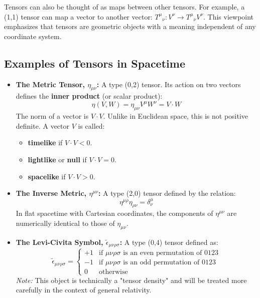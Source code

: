 \documentclass[11pt, a4paper]{report}
\begin{document}
Tensors can also be thought of as maps between other tensors. For example, a (1,1) tensor can map a vector to another vector: ${T^\mu}_\nu: V^\nu \to {T^\mu}_\nu V^\nu$. This viewpoint emphasizes that tensors are geometric objects with a meaning independent of any coordinate system.

\subsection*{Examples of Tensors in Spacetime}
\begin{itemize}
    \item \textbf{The Metric Tensor, $\eta_{\mu\nu}$:} A type (0,2) tensor. Its action on two vectors defines the \textbf{inner product} (or scalar product):
    \begin{equation}
        \eta(V, W) = \eta_{\mu\nu}V^\mu W^\nu = V \cdot W
    \end{equation}
    The norm of a vector is $V \cdot V$. Unlike in Euclidean space, this is not positive definite. A vector $V$ is called:
    \begin{itemize}
        \item \textbf{timelike} if $V \cdot V < 0$.
        \item \textbf{lightlike} or \textbf{null} if $V \cdot V = 0$.
        \item \textbf{spacelike} if $V \cdot V > 0$.
    \end{itemize}

    \item \textbf{The Inverse Metric, $\eta^{\mu\nu}$:} A type (2,0) tensor defined by the relation:
    \begin{equation}
        \eta^{\mu\rho}\eta_{\rho\nu} = \delta^\mu_\nu
    \end{equation}
    In flat spacetime with Cartesian coordinates, the components of $\eta^{\mu\nu}$ are numerically identical to those of $\eta_{\mu\nu}$.

    \item \textbf{The Levi-Civita Symbol, $\tilde{\epsilon}_{\mu\nu\rho\sigma}$:} A type (0,4) tensor defined as:
    \begin{equation}
        \tilde{\epsilon}_{\mu\nu\rho\sigma} =
        \begin{cases}
            +1 & \text{if } \mu\nu\rho\sigma \text{ is an even permutation of } 0123 \\
            -1 & \text{if } \mu\nu\rho\sigma \text{ is an odd permutation of } 0123 \\
            0 & \text{otherwise}
        \end{cases}
    \end{equation}
    \textit{Note:} This object is technically a "tensor density" and will be treated more carefully in the context of general relativity.


\end{itemize}
\end{document}
